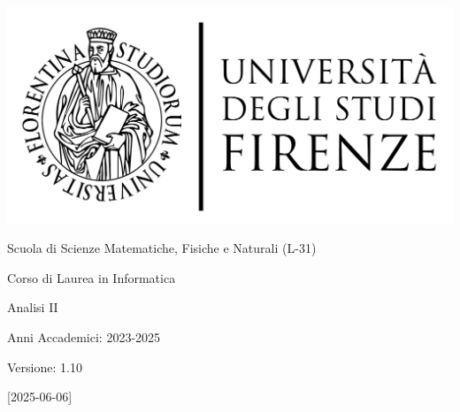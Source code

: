 \documentclass[11pt]{article}
\newcommand{\myDegree}{Corso di Laurea in Informatica}
\newcommand{\myFaculty}{
	Scuola di Scienze Matematiche, Fisiche e Naturali (L{-}31)}
\newcommand{\myTime}{Anni Accademici{:} 2023{-}2025}
\newcommand{\myVersion}{1.10}
\newcommand{\myVersionReleaseDate}{2025{-}06{-}06}
\begin{document}
\begin{titlepage}
   \begin{center}
      \hfill
      \vspace{2cm}

      \begingroup
      \large
      \includegraphics[scale=0.15]{images/unifi-logo}

      \myFaculty{}

      \myDegree{}
      \endgroup

      \vspace{5cm}

      \begingroup
      \LARGE
      \color{red} Analisi II
      \endgroup
      \medskip

      \myTime{}

      \vfill

      \begingroup
      \hfill Versione: \myVersion{}

      \hfill [\myVersionReleaseDate{}]
      \endgroup

   \end{center}
\end{titlepage}
\newpage

\tableofcontents
\newpage


\newpage


\newpage


\newpage


\newpage

\appendix

\newpage
\end{document}
